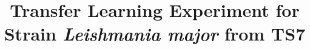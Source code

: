 \documentclass[a4paper,12pt, english]{article}
\begin{document}
\title{Transfer Learning Experiment for Strain \emph{Leishmania major} from TS7}
\maketitle

\end{document}
